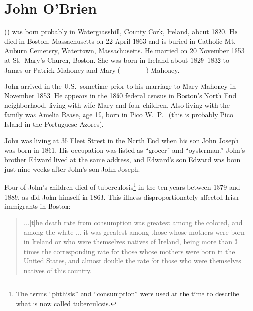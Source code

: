 \section{John O'Brien}

  () was born probably in Watergrasshill, County Cork, Ireland, about 1820.\cite{John2OBrienMarriage} He died in Boston, Massachusetts on 22 April 1863\cite{John2OBrienDeath} and is buried in Catholic Mt. Auburn Cemetery, Watertown, Massachusetts.\cite{BillMcEvoy} He married  on 20 November 1853 at St.\ Mary's Church, Boston.\cite{John2OBrienMarriage} She was born in Ireland about 1829\cite{John2OBrienCivilMarriage}--1832\cite{MaryMahoneyBowserMarriage} to James\cite{MaryMahoneyBowserMarriage} or Patrick\cite{John2OBrienCivilMarriage} Mahoney and Mary (\_\_\_\_\_)  Mahoney.\cite{John2OBrienCivilMarriage} 

John arrived in the U.S.\ sometime prior to his marriage to Mary Mahoney in November 1853. He appears in the 1860 federal census in Boston's North End neighborhood, living with wife Mary and four children. Also living with the family was Amelia Rease, age 19, born in Pico W.\ P.\ \cite{Census1860John} (this is probably Pico Island in the Portuguese Azores). 

John was living at 35 Fleet Street in the North End when his son John Joseph was born in 1861. His occupation was listed as ``grocer''\cite{John3OBrienBirth,Wards} and ``oysterman.''\cite{1861John3OBrien} John's brother Edward lived at the same address, and Edward's son Edward was born just nine weeks after John's son John Joseph.\cite{John3OBrienBirth}

Four of John's children died of tuberculosis\footnote{The terms ``phthisis'' and ``consumption'' were used at the time to describe what is now called tuberculosis.\cite{TuberculosisHistory}} in the ten years between 1879 and 1889, as did John himself in 1863.\cite{John2OBrienDeath} This illness disproportionately affected Irish immigrants in Boston:

\begin{quote}
	...[t]he death rate from consumption was greatest among the colored, and among the white ... it was greatest among those whose mothers were born in Ireland or who were themselves natives of Ireland, being more than 3 times the corresponding rate for those whose mothers were born in the United States, and almost double the rate for those who were themselves natives of this country.\cite{VitalStatistics}
\end{quote}

